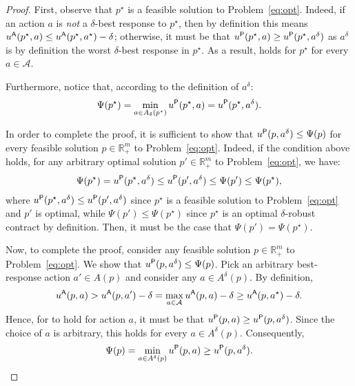 \begin{proof}
	First, observe that $p^\star$ is a feasible solution to Problem~\eqref{eq:opt}.
	Indeed, if an action $a$ is {\em not} a $\delta$-best response to $p^\star$, then by definition this means $u^{\mathsf{A}}(p^\star, a) \le u^{\mathsf{A}}(p^\star, a^\star) - \delta$; otherwise, it must be that $u^{\mathsf{P}}(p^\star, a) \ge u^{\mathsf{P}}(p^\star, a^\delta)$ as $a^\delta$ is by definition the worst $\delta$-best response in $p^\star$.
	As a result,  holds for $p^\star$ for every $a \in \mathcal{A}$.
	
	Furthermore, notice that, according to the definition of $a^\delta$:
	\[
	\Psi(p^\star) = \min_{a \in A_\delta(p^\star)} u^{\mathsf{P}}(p^\star, a) = u^{\mathsf{P}}(p^\star, a^\delta).
	\]
	
	In order to complete the proof, it is sufficient to show that $u^{\mathsf{P}}(p, a^\delta) \le \Psi(p)$ for every feasible solution $p\in \mathbb{R}_+^m$ to Problem~\eqref{eq:opt}.
	Indeed, if the condition above holds, for any arbitrary optimal solution $p'\in \mathbb{R}_+^m$ to Problem~\eqref{eq:opt}, we have:
	\begin{align*}
		\Psi(p^\star)
		= u^{\mathsf{P}}(p^\star, a^\delta) 
		\le u^{\mathsf{P}}(p', a^\delta)
		\le \Psi(p') 
		\le \Psi(p^\star),
	\end{align*}
	where $u^{\mathsf{P}}(p^\star, a^\delta) \le u^{\mathsf{P}}(p', a^\delta)$ since $p^\star$ is a feasible solution to Problem~\eqref{eq:opt} and $p'$ is optimal,
	while $\Psi(p') \le \Psi(p^\star)$ since $p^\star$ is an optimal $\delta$-robust contract by definition.
	Then, it must be the case that $\Psi(p') = \Psi(p^\star)$.
	
	Now, to complete the proof, consider any feasible solution $p\in \mathbb{R}_+^m$ to Problem~\eqref{eq:opt}. We show that $u^{\mathsf{P}}(p, a^\delta) \le \Psi(p)$.
	Pick an arbitrary best-response action $a' \in A(p)$ and consider any $a \in A^\delta(p)$.
	By definition,
	\begin{align*}
		u^{\mathsf{A}}(p, a) > u^{\mathsf{A}}(p, a') - \delta = \max_{a \in \mathcal{A}} u^{\mathsf{A}}(p, a) - \delta 
		\ge u^{\mathsf{A}}(p, a^\star) - \delta.
	\end{align*}
	Hence, for  to hold for action $a$, it must be that $u^{\mathsf{P}}(p, a) \ge u^{\mathsf{P}}(p, a^\delta)$.
	Since the choice of $a$ is arbitrary, this holds for every $a \in A^\delta(p)$.
	Consequently,
	\[
	\Psi(p) = \min_{a \in A^\delta(p)} u^{\mathsf{P}}(p, a) \ge u^{\mathsf{P}}(p, a^\delta).
	\qedhere
	\]
\end{proof}

